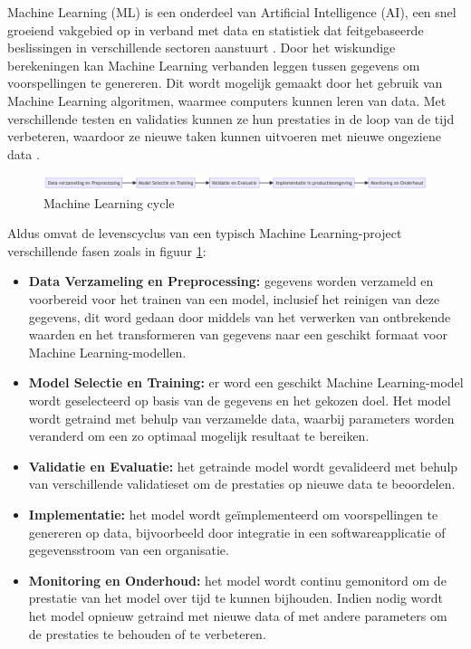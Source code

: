 Machine Learning (ML) is een onderdeel van Artificial Intelligence (AI), een snel groeiend vakgebied op in verband met data en statistiek dat feitgebaseerde beslissingen in verschillende sectoren aanstuurt \autocite{Jordan2015}. Door het wiskundige berekeningen kan Machine Learning verbanden leggen tussen gegevens om voorspellingen te genereren. Dit wordt mogelijk gemaakt door het gebruik van Machine Learning algoritmen, waarmee computers kunnen leren van data. Met verschillende testen en validaties kunnen ze hun prestaties in de loop van de tijd verbeteren, waardoor ze nieuwe taken kunnen uitvoeren met nieuwe ongeziene data \autocite{Shaveta2023}.\newline

\begin{figure}[h]
    \includegraphics[width=\linewidth]{graphics/mlcycle.png}
    \caption{Machine Learning cycle}
    \label{fig:ML_cycle}
\end{figure}

Aldus \textcite{Schlegel2022} omvat de levenscyclus van een typisch Machine Learning-project verschillende fasen zoals in figuur \ref{fig:ML_cycle}:

\begin{itemize}
    \item \textbf{Data Verzameling en Preprocessing:} gegevens worden verzameld en voorbereid voor het trainen van een model, inclusief het reinigen van deze gegevens, dit word gedaan door middels van het verwerken van ontbrekende waarden en het transformeren van gegevens naar een geschikt formaat voor Machine Learning-modellen.

    \item \textbf{Model Selectie en Training:} er word een geschikt Machine Learning-model wordt geselecteerd op basis van de gegevens en het gekozen doel. Het model wordt getraind met behulp van verzamelde data, waarbij parameters worden veranderd om een zo optimaal mogelijk resultaat te bereiken.
    
    \item \textbf{Validatie en Evaluatie:} het getrainde model wordt gevalideerd met behulp van verschillende validatieset om de prestaties op nieuwe data te beoordelen.
    
    \item \textbf{Implementatie:} het model wordt geïmplementeerd om voorspellingen te genereren op data, bijvoorbeeld door integratie in een softwareapplicatie of gegevensstroom van een organisatie.

    \item \textbf{Monitoring en Onderhoud:} het model wordt continu gemonitord om de prestatie van het model over tijd te kunnen bijhouden. Indien nodig wordt het model opnieuw getraind met nieuwe data of met andere parameters om de prestaties te behouden of te verbeteren.
\end{itemize}

